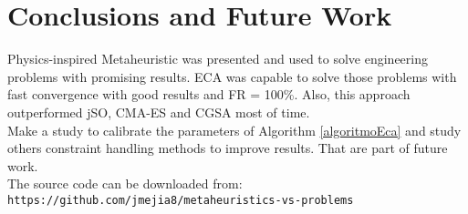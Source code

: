 \documentclass[12pt,letterpape]{article}
\begin{document}
\section{Conclusions and Future Work} %
\label{sec:conclusion_and_future_work}

Physics-inspired Metaheuristic was presented and used to solve engineering 
problems with promising results. ECA was capable to solve those problems with fast
convergence with good results and FR = 100\%. Also, this approach outperformed jSO,
CMA-ES and CGSA most of time.\\

Make a study to calibrate the parameters of Algorithm \ref{algoritmoEca} and study
others constraint handling methods to improve results. That are part of future work.\\

\noindent
The source code can be downloaded from:\\
\verb|https://github.com/jmejia8/metaheuristics-vs-problems|




\end{document}
